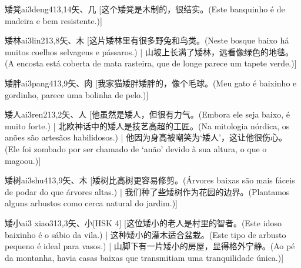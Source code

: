 \begin{entry}{矮凳}{ai3deng4}{13,14}{⽮、⼏}
  [这个矮凳是木制的，很结实。(Este banquinho é de madeira e bem resistente.)]
\end{entry}

\begin{entry}{矮林}{ai3lin2}{13,8}{⽮、⽊}
  [这片矮林里有很多野兔和鸟类。(Neste bosque baixo há muitos coelhos selvagens e pássaros.) | 山坡上长满了矮林，远看像绿色的地毯。(A encosta está coberta de mata rasteira, que de longe parece um tapete verde.)]
\end{entry}

\begin{entry}{矮胖}{ai3pang4}{13,9}{⽮、⾁}
  [我家猫矮胖矮胖的，像个毛球。(Meu gato é baixinho e gordinho, parece uma bolinha de pelo.)]
\end{entry}

\begin{entry}{矮人}{ai3ren2}{13,2}{⽮、⼈}
  [他虽然是矮人，但很有力气。(Embora ele seja baixo, é muito forte.) | 北欧神话中的矮人是技艺高超的工匠。(Na mitologia nórdica, os anões são artesãos habilidosos.) | 他因为身高被嘲笑为‘矮人’，这让他很伤心。(Ele foi zombado por ser chamado de ‘anão’ devido à sua altura, o que o magoou.)]
\end{entry}

\begin{entry}{矮树}{ai3shu4}{13,9}{⽮、⽊}
  [矮树比高树更容易修剪。(Árvores baixas são mais fáceis de podar do que árvores altas.) | 我们种了些矮树作为花园的边界。(Plantamos alguns arbustos como cerca natural do jardim.)]
\end{entry}

\begin{entry}{矮小}{ai3 xiao3}{13,3}{⽮、⼩}[HSK 4]
  [这位矮小的老人是村里的智者。(Este idoso baixinho é o sábio da vila.) | 这种矮小的灌木适合盆栽。(Este tipo de arbusto pequeno é ideal para vasos.) | 山脚下有一片矮小的房屋，显得格外宁静。(Ao pé da montanha, havia casas baixas que transmitiam uma tranquilidade única.)]
\end{entry}

